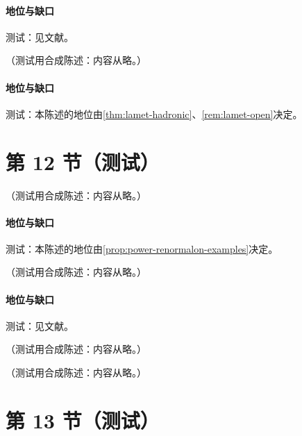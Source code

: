 \paragraph{地位与缺口}测试：见文献。

\begin{proposition}\label{prop:yzliu-on-factorial}
（测试用合成陈述：内容从略。）
\end{proposition}
\paragraph{地位与缺口}测试：本陈述的地位由\cref{thm:lamet-hadronic}、\cref{rem:lamet-open}决定。

\section{第 12 节（测试）}\label{sec:yzliu-decay}

\begin{proposition}\label{prop:yzliu-nlsm}
（测试用合成陈述：内容从略。）
\end{proposition}
\paragraph{地位与缺口}测试：本陈述的地位由\cref{prop:power-renormalon-examples}决定。

\begin{proposition}\label{prop:yzliu-2dqcd}
（测试用合成陈述：内容从略。）
\end{proposition}
\paragraph{地位与缺口}测试：见文献。

\begin{remark}[坐标空间与动量空间之间变换的教训]\label{rem:yzliu-transforms}
（测试用合成陈述：内容从略。）
\end{remark}

\begin{remark}[瞬子与模型研究]\label{rem:yzliu-instantons}
（测试用合成陈述：内容从略。）
\end{remark}

\section{第 13 节（测试）}\label{sec:yzliu-status}

